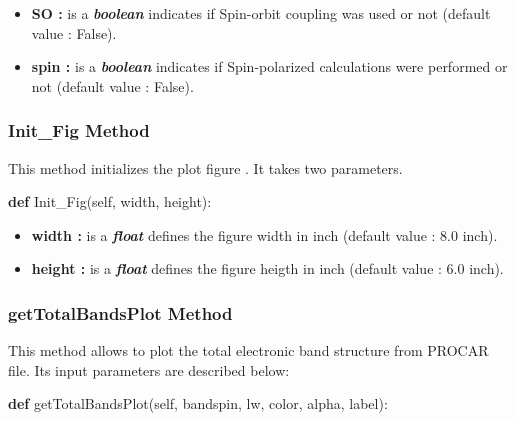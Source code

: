 \documentclass[11pt]{article}
\providecommand{\tightlist}{%
      \setlength{\itemsep}{0pt}\setlength{\parskip}{0pt}}
\newenvironment{Shaded}{}{}
\newcommand{\KeywordTok}[1]{\textcolor[rgb]{0.00,0.44,0.13}{\textbf{{#1}}}}
\newcommand{\NormalTok}[1]{{#1}}
\newcommand{\VariableTok}[1]{\textcolor[rgb]{0.10,0.09,0.49}{{#1}}}
\begin{document}
\begin{itemize}
\tightlist
\item
  \textbf{SO :} is a \textbf{\emph{boolean}} indicates if Spin-orbit
  coupling was used or not (default value : False).
\item
  \textbf{spin :} is a \textbf{\emph{boolean}} indicates if
  Spin-polarized calculations were performed or not (default value :
  False).
\end{itemize}

\subsubsection{Init\_Fig Method}\label{initux5ffig-method}

This method initializes the plot figure . It takes two parameters.

\begin{Shaded}
\begin{Highlighting}[]
\KeywordTok{def} \NormalTok{Init_Fig(}\VariableTok{self}\NormalTok{, width, height):}
\end{Highlighting}
\end{Shaded}

\begin{itemize}
\tightlist
\item
  \textbf{width :} is a \textbf{\emph{float}} defines the figure width
  in inch (default value : 8.0 inch).
\item
  \textbf{height :} is a \textbf{\emph{float}} defines the figure heigth
  in inch (default value : 6.0 inch).
\end{itemize}

\subsubsection{getTotalBandsPlot Method}\label{gettotalbandsplot-method}

This method allows to plot the total electronic band structure from
PROCAR file. Its input parameters are described below:

\begin{Shaded}
\begin{Highlighting}[]
\KeywordTok{def} \NormalTok{getTotalBandsPlot(}\VariableTok{self}\NormalTok{, bandspin, lw, color, alpha, label):}
\end{Highlighting}
\end{Shaded}
\end{document}
